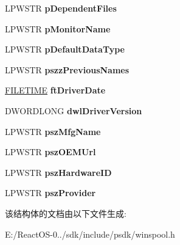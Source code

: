 \begin{DoxyCompactItemize}
L\+P\+W\+S\+TR {\bfseries p\+Dependent\+Files}
\item 
\mbox{\label{struct___d_r_i_v_e_r___i_n_f_o__6_w_a1ef980b227d91bd9be5e760675a3b724}} 
L\+P\+W\+S\+TR {\bfseries p\+Monitor\+Name}
\item 
\mbox{\label{struct___d_r_i_v_e_r___i_n_f_o__6_w_a8e21e15c5bd8d16c8ad9052024061d6f}} 
L\+P\+W\+S\+TR {\bfseries p\+Default\+Data\+Type}
\item 
\mbox{\label{struct___d_r_i_v_e_r___i_n_f_o__6_w_a781be0199f15f52ad2e630e87eb108b4}} 
L\+P\+W\+S\+TR {\bfseries pszz\+Previous\+Names}
\item 
\mbox{\label{struct___d_r_i_v_e_r___i_n_f_o__6_w_a6c278074fe2a532582911873369293f3}} 
\hyperlink{struct___f_i_l_e_t_i_m_e}{F\+I\+L\+E\+T\+I\+ME} {\bfseries ft\+Driver\+Date}
\item 
\mbox{\label{struct___d_r_i_v_e_r___i_n_f_o__6_w_a737c0368eae43b5fa294c014fa762fd0}} 
D\+W\+O\+R\+D\+L\+O\+NG {\bfseries dwl\+Driver\+Version}
\item 
\mbox{\label{struct___d_r_i_v_e_r___i_n_f_o__6_w_a797038f446548818f8a93edca44923c1}} 
L\+P\+W\+S\+TR {\bfseries psz\+Mfg\+Name}
\item 
\mbox{\label{struct___d_r_i_v_e_r___i_n_f_o__6_w_a62884d1683636e3ba997786e81d37083}} 
L\+P\+W\+S\+TR {\bfseries psz\+O\+E\+M\+Url}
\item 
\mbox{\label{struct___d_r_i_v_e_r___i_n_f_o__6_w_ad10906d42f4cb880a49657d574d7079e}} 
L\+P\+W\+S\+TR {\bfseries psz\+Hardware\+ID}
\item 
\mbox{\label{struct___d_r_i_v_e_r___i_n_f_o__6_w_adadd405da8879c6ea2cc7fe7280a417e}} 
L\+P\+W\+S\+TR {\bfseries psz\+Provider}
\end{DoxyCompactItemize}


该结构体的文档由以下文件生成\+:\begin{DoxyCompactItemize}
\item 
E\+:/\+React\+O\+S-\/0../sdk/include/psdk/winspool.\+h\end{DoxyCompactItemize}
